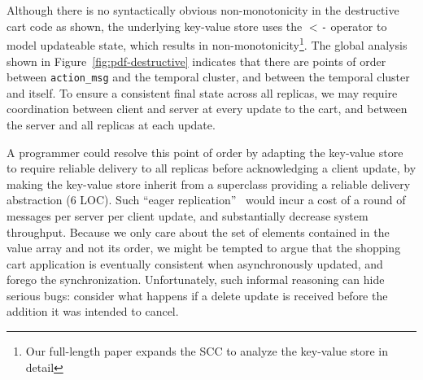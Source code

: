 Although there is no syntactically obvious non-monotonicity in the destructive
cart code as shown, the underlying key-value store uses the \texttt{$<$-} operator to model updateable state, which results in non-monotonicity\footnote{Our full-length paper expands the SCC to analyze the
key-value store in detail}.
The global analysis shown in Figure~\ref{fig:pdf-destructive}
indicates that there are
points of order between \texttt{action\_msg} and the temporal cluster,
and between the temporal cluster and itself.
To ensure a consistent final state across all replicas, we may require coordination
between client and server at every update to the cart, and between the 
server and all replicas at each update.   

A programmer could resolve this point of order by adapting the key-value store
to require reliable delivery to all replicas before acknowledging a client update, by
making the key-value store inherit from a superclass providing a reliable delivery
abstraction (6 LOC).
Such ``eager replication''~\cite{dangers} would incur a cost of a round of messages
per server per client update, and substantially decrease system throughput.  
Because we only care about the set of elements contained in the value array
and not its order, we might be tempted to argue that 
the shopping cart application is eventually consistent
when asynchronously updated, and forego the synchronization.  Unfortunately, such informal reasoning can hide serious bugs: consider what happens if a delete update is received
before the addition it was intended to cancel.




